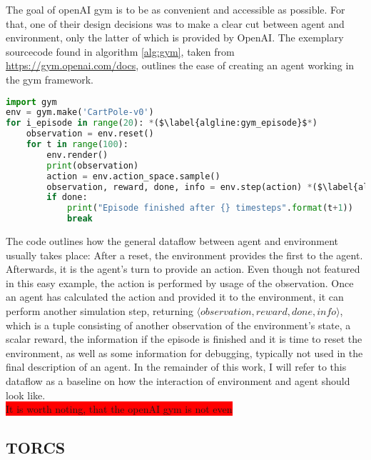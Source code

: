 The goal of openAI gym is to be as convenient and accessible as possible. For that, one of their design decisions was to make a clear cut between agent and environment, only the latter of which is provided by OpenAI. The exemplary sourcecode found in algorithm \ref{alg:gym}, taken from \url{https://gym.openai.com/docs}, outlines the ease of creating an agent working in the gym framework.
\begin{algorithm}[h]
\begin{lstlisting}[language=Python,frame=none]
import gym
env = gym.make('CartPole-v0')
for i_episode in range(20): *($\label{algline:gym_episode}$*)
	observation = env.reset()
	for t in range(100):
		env.render()
		print(observation)
		action = env.action_space.sample()
		observation, reward, done, info = env.step(action) *($\label{algline:gym_envstep}$*)
		if done:
			print("Episode finished after {} timesteps".format(t+1))
			break
\end{lstlisting}%
\caption{Interaction with the openAI gym environment}
\label{alg:gym}
\end{algorithm}


The code outlines how the general dataflow between agent and environment usually takes place: After a reset, the environment provides the first  to the agent. Afterwards, it is the agent's turn to provide an action. Even though not featured in this easy example, the action is performed by usage of the observation. Once an agent has calculated the action and provided it to the environment, it can perform another simulation step, returning $\langle observation, reward, done, info\rangle$, which is a tuple consisting of another observation of the environment's state, a scalar reward, the information if the episode is finished and it is time to reset the environment, as well as some information for debugging, typically not used in the final description of an agent. In the remainder of this work, I will refer to this dataflow as a baseline on how the interaction of environment and agent should look like.\\

\colorbox{red}{It is worth noting, that the openAI gym is not even}


\subsection{TORCS}

